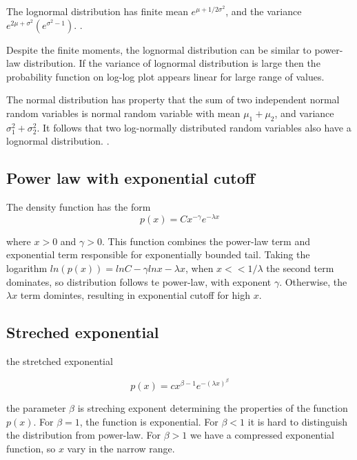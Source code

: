 The lognormal distribution has finite mean $e^{\mu+1/2\sigma^2}$, and the variance $e^{2\mu+\sigma^2}(e^{\sigma^2 -1})$.  \cite{mitzenmacher2004brief}.

Despite the finite moments, the lognormal distribution can be similar to power-law distribution. If the variance of lognormal distribution is large then the probability function on log-log plot appears linear for large range of values. 

The normal distribution has property that the sum of two independent normal random variables is normal random variable with mean $\mu_1+\mu_2$, and variance $\sigma_1^2+ \sigma_2^2$. It follows that two log-normally distributed random variables also have a lognormal distribution. \cite{mitzenmacher2004brief}. 

\subsection{Power law with exponential cutoff}

The density function has the form
\begin{equation}
p(x) = C x^{-\gamma}e^{-\lambda x}
\end{equation}

where $x>0$ and $\gamma>0$. This function combines the power-law term and exponential term responsible for exponentially bounded tail. Taking the logarithm $ln(p(x)) = lnC - \gamma lnx - \lambda x$, when $x<<1/\lambda$ the second term dominates, so distribution follows te power-law, with exponent $\gamma$. Otherwise, the $\lambda x$ term domintes, resulting in exponential cutoff for high $x$. 

\subsection{Streched exponential}

the stretched exponential 

\begin{equation}
p(x) = c x^{\beta - 1}e^{-(\lambda x)^{\beta}}
\end{equation}

 the parameter $\beta$ is streching exponent determining the properties of the function $p(x)$. For $\beta=1$, the function is exponential. For $\beta<1$ it is hard to distinguish the distribution from power-law. For $\beta>1$ we have a compressed exponential function, so $x$ vary in the narrow range. \\

